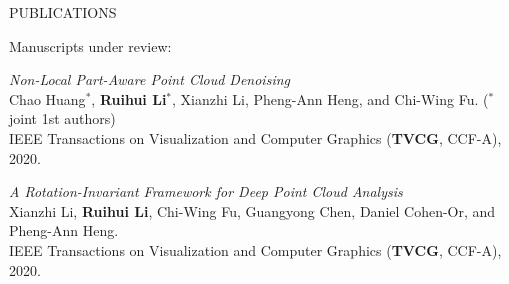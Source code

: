 \documentclass[UTF8]{cv} %
\begin{document}
\begin{rSection}{PUBLICATIONS}


\hspace{-7mm} Manuscripts under review:
\begin{etaremune}[itemindent=0.00em]
    \renewcommand\labelenumi{[M\theenumi]}
    \item  \emph{Non-Local Part-Aware Point Cloud Denoising}
\\    Chao Huang$^*$, \textbf{Ruihui Li}$^*$, Xianzhi Li, Pheng-Ann Heng, and Chi-Wing Fu. ($^*$joint 1st authors)
\\    IEEE Transactions on Visualization and Computer Graphics  (\textbf{TVCG}, CCF-A), 2020.
    \item  \emph{A Rotation-Invariant Framework for Deep Point Cloud Analysis}
\\    Xianzhi Li, \textbf{Ruihui Li}, Chi-Wing Fu, Guangyong Chen, Daniel Cohen-Or, and Pheng-Ann Heng.
\\    IEEE Transactions on Visualization and Computer Graphics  (\textbf{TVCG}, CCF-A), 2020.
\end{etaremune}

\vspace{2cm}

\end{rSection}
\end{document}
